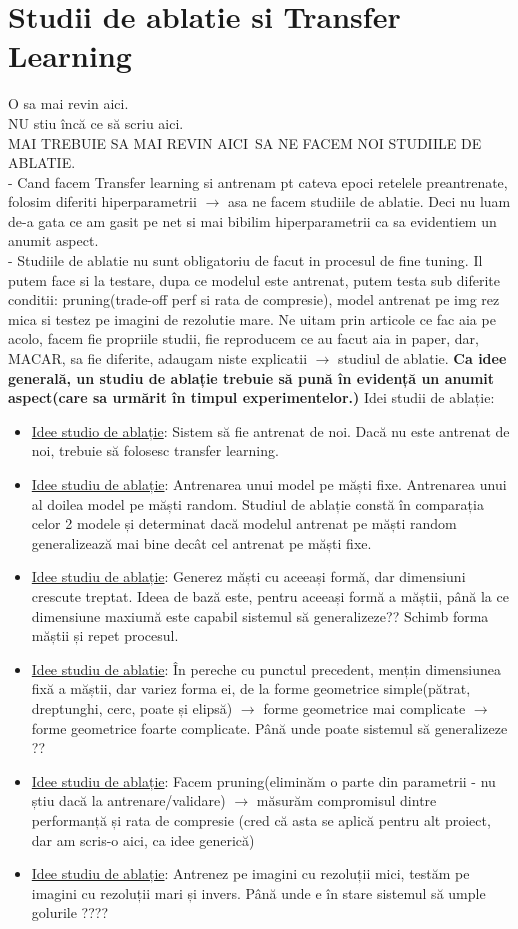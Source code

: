 \documentclass[12pt, a4paper]{article}
\begin{document}
\section{Studii de ablatie si Transfer Learning}
O sa mai revin aici.\\
NU stiu încă ce să scriu aici.\\
MAI TREBUIE SA MAI REVIN AICI\
SA NE FACEM NOI STUDIILE DE ABLATIE.\\
- Cand facem Transfer learning si antrenam pt cateva epoci retelele preantrenate, folosim diferiti hiperparametrii $\rightarrow$ asa ne facem studiile de ablatie. Deci nu luam de-a gata ce am gasit pe net si mai bibilim hiperparametrii ca sa evidentiem un anumit aspect.\\
- Studiile de ablatie nu sunt obligatoriu de facut in procesul de fine tuning. Il putem face si la testare, dupa ce modelul este antrenat, putem testa sub diferite conditii: pruning(trade-off perf si rata de compresie), model antrenat pe img rez mica si testez pe imagini de rezolutie mare. Ne uitam prin articole ce fac aia pe acolo, facem fie propriile studii, fie reproducem ce au facut aia in paper, dar, MACAR, sa fie diferite, adaugam niste explicatii $\rightarrow$ studiul de ablatie.
\textbf{\color{red} Ca idee generală, un studiu de ablație trebuie să pună în evidență un anumit aspect(care sa urmărit în timpul experimentelor.)}
Idei studii de ablație:
\begin{itemize}
    \item \underline{Idee studio de ablație}: Sistem să fie antrenat de noi. Dacă nu este antrenat de noi, trebuie să folosesc transfer learning.
    \item \underline{Idee studiu de ablație}: Antrenarea unui model pe măști fixe. Antrenarea unui al doilea model pe măști random. Studiul de ablație constă în comparația celor 2 modele și determinat dacă modelul antrenat pe măști random generalizează mai bine decât cel antrenat pe măști fixe.
    \item \underline{Idee studiu de ablație}: Generez măști cu aceeași formă, dar dimensiuni crescute treptat. Ideea de bază este, pentru aceeași formă a măștii, până la ce dimensiune maxiumă este capabil sistemul să generalizeze?? Schimb forma măștii și repet procesul.
    \item \underline{Idee studiu de ablatie}: În pereche cu punctul precedent, mențin dimensiunea fixă a măștii, dar variez forma ei, de la forme geometrice simple(pătrat, dreptunghi, cerc, poate și elipsă) $\rightarrow$ forme geometrice mai complicate $\rightarrow$ forme geometrice foarte complicate. Până unde poate sistemul să generalizeze ??
    \item \underline{Idee studiu de ablație}: Facem pruning(eliminăm o parte din parametrii - nu știu dacă la antrenare/validare) $\rightarrow$ măsurăm compromisul dintre performanță și rata de compresie (cred că asta se aplică pentru alt proiect, dar am scris-o aici, ca idee generică)
    \item \underline{Idee studiu de ablație}: Antrenez pe imagini cu rezoluții mici, testăm pe imagini cu rezoluții mari și invers. Până unde e în stare sistemul să umple golurile ????
\end{itemize}
\end{document}
